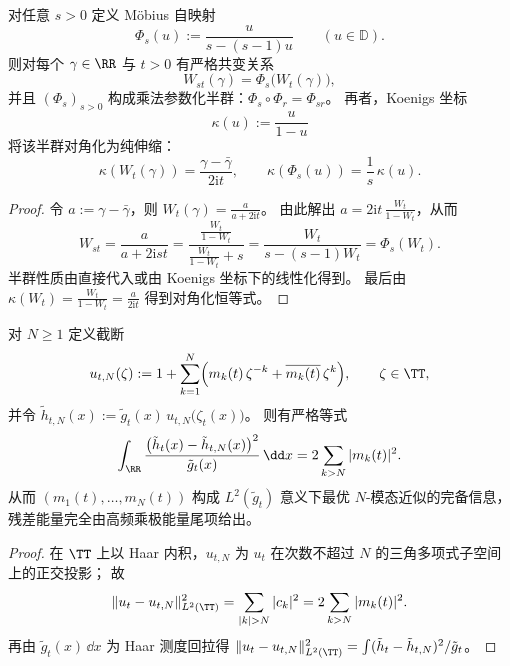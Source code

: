 \begin{proposition}\label{prop:xi-poisson-cauchy-multipole-mobius-koenigs}
对任意 \(s>0\) 定义 Möbius 自映射
\[
\Phi_s(u):=\frac{u}{s-(s-1)u}\qquad(u\in\mathbb D).
\]
则对每个 \(\gamma\in\RR\) 与 \(t>0\) 有严格共变关系
\[
W_{st}(\gamma)=\Phi_s\bigl(W_t(\gamma)\bigr),
\]
并且 \((\Phi_s)_{s>0}\) 构成乘法参数化半群：\(\Phi_s\circ\Phi_r=\Phi_{sr}\)。
再者，Koenigs 坐标
\[
\kappa(u):=\frac{u}{1-u}
\]
将该半群对角化为纯伸缩：
\[
\kappa\!\left(W_t(\gamma)\right)=\frac{\gamma-\bar\gamma}{2\mathrm{i}t},
\qquad
\kappa(\Phi_s(u))=\frac{1}{s}\,\kappa(u).
\]
\end{proposition}
\begin{proof}
令 \(a:=\gamma-\bar\gamma\)，则 \(W_t(\gamma)=\frac{a}{a+2\mathrm{i}t}\)。
由此解出 \(a=2\mathrm{i}t\,\frac{W_t}{1-W_t}\)，从而
\[
W_{st}
=\frac{a}{a+2\mathrm{i}st}
=\frac{\frac{W_t}{1-W_t}}{\frac{W_t}{1-W_t}+s}
=\frac{W_t}{s-(s-1)W_t}
=\Phi_s(W_t).
\]
半群性质由直接代入或由 Koenigs 坐标下的线性化得到。
最后由 \(\kappa(W_t)=\frac{W_t}{1-W_t}=\frac{a}{2\mathrm{i}t}\) 得到对角化恒等式。
\end{proof}

\begin{proposition}\label{prop:xi-poisson-cauchy-multipole-truncation-l2}
对 \(N\ge1\) 定义截断
\[
u_{t,N}(\zeta):=1+\sum_{k=1}^{N}\Bigl(m_k(t)\,\zeta^{-k}+\overline{m_k(t)}\,\zeta^{k}\Bigr),
\qquad \zeta\in\TT,
\]
并令 \( \tilde h_{t,N}(x):=\tilde g_t(x)\,u_{t,N}\bigl(\zeta_t(x)\bigr)\)。
则有严格等式
\[
\int_{\RR}\frac{\bigl(\tilde h_t(x)-\tilde h_{t,N}(x)\bigr)^2}{\tilde g_t(x)}\,\dd x
=2\sum_{k>N}|m_k(t)|^2.
\]
从而 \((m_1(t),\dots,m_N(t))\) 构成 \(L^2(\tilde g_t)\) 意义下最优 \(N\)-模态近似的完备信息，残差能量完全由高频乘极能量尾项给出。
\end{proposition}
\begin{proof}
在 \(\TT\) 上以 Haar 内积，\(u_{t,N}\) 为 \(u_t\) 在次数不超过 \(N\) 的三角多项式子空间上的正交投影；
故
\[
\|u_t-u_{t,N}\|_{L^2(\TT)}^2=\sum_{|k|>N}|c_k|^2=2\sum_{k>N}|m_k(t)|^2.
\]
再由 \(\tilde g_t(x)\,\dd x\) 为 Haar 测度回拉得
\(
\|u_t-u_{t,N}\|_{L^2(\TT)}^2=\int(\tilde h_t-\tilde h_{t,N})^2/\tilde g_t
\)。
\end{proof}

\endinput

